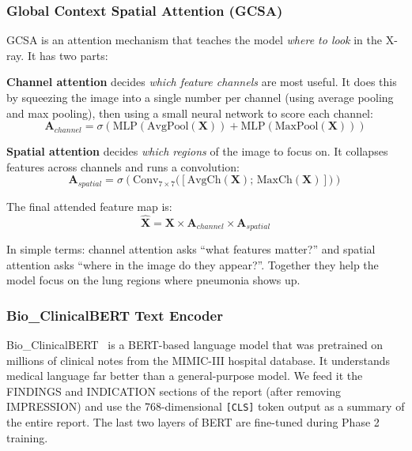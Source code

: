 \documentclass{article}
\begin{document}
\subsubsection{Global Context Spatial Attention (GCSA)}

GCSA is an attention mechanism that teaches the model \emph{where to look}
in the X-ray. It has two parts:

\textbf{Channel attention} decides \emph{which feature channels} are most
useful. It does this by squeezing the image into a single number per channel
(using average pooling and max pooling), then using a small neural network to
score each channel:
\begin{equation}
  \mathbf{A}_{channel} = \sigma\!\left(
    \text{MLP}(\text{AvgPool}(\mathbf{X})) +
    \text{MLP}(\text{MaxPool}(\mathbf{X}))
  \right)
  \label{eq:ach}
\end{equation}

\textbf{Spatial attention} decides \emph{which regions} of the image
to focus on. It collapses features across channels and runs a convolution:
\begin{equation}
  \mathbf{A}_{spatial} = \sigma\!\left(
    \text{Conv}_{7\times7}\bigl([\text{AvgCh}(\mathbf{X});\,\text{MaxCh}(\mathbf{X})]\bigr)
  \right)
  \label{eq:asp}
\end{equation}

The final attended feature map is:
\begin{equation}
  \hat{\mathbf{X}} = \mathbf{X} \times \mathbf{A}_{channel} \times \mathbf{A}_{spatial}
  \label{eq:gcsa}
\end{equation}

In simple terms: channel attention asks ``what features matter?'' and spatial
attention asks ``where in the image do they appear?''. Together they help the
model focus on the lung regions where pneumonia shows up.

\subsubsection{Bio\_ClinicalBERT Text Encoder}

Bio\_ClinicalBERT~\cite{alsentzer2019bert} is a BERT-based language model
that was pretrained on millions of clinical notes from the MIMIC-III hospital
database. It understands medical language far better than a general-purpose
model. We feed it the FINDINGS and INDICATION sections of the report
(after removing IMPRESSION) and use the 768-dimensional \texttt{[CLS]} token
output as a summary of the entire report. The last two layers of BERT are
fine-tuned during Phase 2 training.
\end{document}
